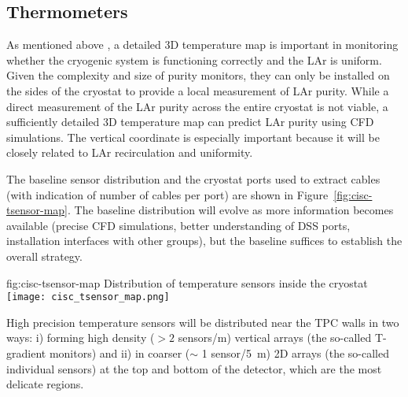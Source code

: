 


\subsection{Thermometers}
\label{sec:fdsp-cryo-therm}
As mentioned above  , a detailed 3D temperature map is important in monitoring whether the cryogenic system is functioning correctly and the LAr is uniform.
Given the complexity and size of purity monitors, they can only be installed on the sides of the cryostat to provide a local measurement of
LAr purity. While a direct measurement of the LAr purity across the entire cryostat is not viable, a sufficiently detailed 3D temperature map
can predict LAr purity using CFD simulations. The vertical coordinate is especially important because it will be closely related to
LAr recirculation and uniformity. 

The baseline sensor distribution and the cryostat ports used to extract cables (with indication of number of cables per port) are shown in Figure~\ref{fig:cisc-tsensor-map}. The baseline distribution will evolve as more information becomes available (precise CFD simulations, better understanding of DSS ports, installation interfaces with other groups), but the baseline suffices to establish the overall strategy.

\begin{dunefigure}{fig:cisc-tsensor-map}
  {Distribution of temperature sensors inside the cryostat}
  \texttt{[image: cisc\_tsensor\_map.png]}
\end{dunefigure}

High precision temperature sensors will be distributed near the TPC walls in two ways:
i) forming high density (\(>2\) sensors/\si{m}) vertical arrays (the so-called T-gradient monitors) and ii) in coarser ($\sim$ 1 sensor/\SI{5}{m}) 2D arrays (the so-called individual sensors) at the top and bottom of the detector, which are the most delicate regions. 

